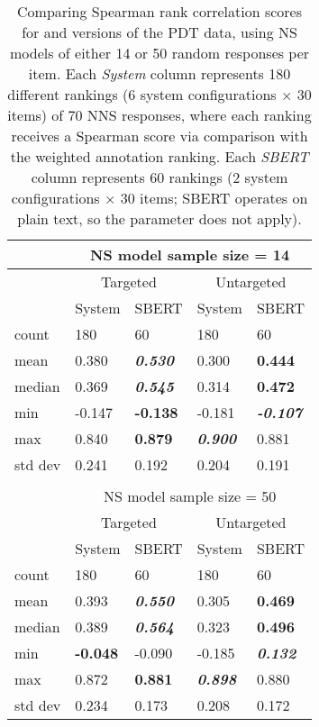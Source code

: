\begin{table}[htb!]
\begin{center}
\begin{tabular}{|l||l|l||l|l|}
\hline
& \multicolumn{4}{c|}{NS model sample size = 14} \\
\hline
 & \multicolumn{2}{c||}{Targeted} & \multicolumn{2}{c|}{Untargeted} \\
\hline
	& System 		& SBERT 		& System 	& SBERT \\
\hline
count 	& 180 		& 60 		& 180 		& 60 \\
\hline
mean 	& 0.380 	& \textit{\textbf{0.530}} 	& 0.300 	& \textbf{0.444} \\
\hline
median 	& 0.369 	& \textit{\textbf{0.545}} 	& 0.314 	& \textbf{0.472} \\
\hline
min & -0.147 	& \textbf{-0.138} & -0.181 	& \textit{\textbf{-0.107}} \\
\hline
max 	& 0.840 	& \textbf{0.879} 	& \textit{\textbf{0.900}}	& 0.881 \\
\hline
std dev 	& 0.241 	& 0.192 	& 0.204 	& 0.191 \\
\hline
\multicolumn{5}{c}{} \\
\hline
& \multicolumn{4}{c|}{NS model sample size = 50} \\
\hline
& \multicolumn{2}{c||}{Targeted} & \multicolumn{2}{c|}{Untargeted} \\
\hline
		& System 		& SBERT 						& System 		& SBERT \\
\hline
count	& 180 			& 60 						& 180 			& 60 \\
\hline
mean 	& 0.393 		& \textit{\textbf{0.550}} 	& 0.305 		& \textbf{0.469}  \\
\hline
median 	& 0.389 		& \textit{\textbf{0.564}} 	& 0.323			& \textbf{0.496} \\
\hline
min 	& \textbf{-0.048} & -0.090					& -0.185 		& \textit{\textbf{0.132}} \\
\hline
max 	& 0.872 		& \textbf{0.881}			& \textit{\textbf{0.898}} 	& 0.880 \\
\hline
std dev 				& 0.234 		& 0.173		& 0.208 		& 0.172 \\
\hline
\end{tabular}
\caption{\label{tab:targeting-results} Comparing Spearman rank correlation scores for  and  versions of the PDT data, using NS models of either 14 or 50 random responses per item. Each \textit{System} column represents 180 different rankings (6 system configurations $\times$ 30 items) of 70 NNS responses, where each ranking receives a Spearman score via comparison with the weighted annotation ranking. Each \textit{SBERT} column represents 60 rankings (2 system configurations $\times$ 30 items; SBERT operates on plain text, so the  parameter does not apply).
}
\end{center}
\end{table}


